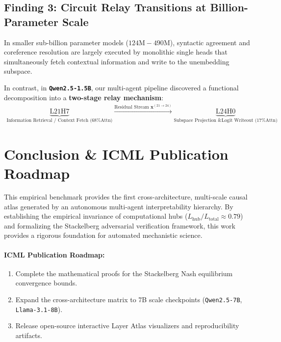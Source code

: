 \documentclass[10pt,a4paper]{article}
\begin{document}
\subsection{Finding 3: Circuit Relay Transitions at Billion-Parameter Scale}
In smaller sub-billion parameter models ($124\text{M} - 490\text{M}$), syntactic agreement and coreference resolution are largely executed by monolithic single heads that simultaneously fetch contextual information and write to the unembedding subspace. 

In contrast, in \textbf{\texttt{Qwen2.5-1.5B}}, our multi-agent pipeline discovered a functional decomposition into a \textbf{two-stage relay mechanism}:
\begin{equation}
\begin{aligned}
\underbrace{\text{L21H7}}_{\text{Information Retrieval / Context Fetch (68\% Attn)}} \xrightarrow{\text{Residual Stream } \boldsymbol{x}^{(21 \rightarrow 24)}} \underbrace{\text{L24H0}}_{\text{Subspace Projection \& Logit Writeout (17\% Attn)}}
\end{aligned}
\end{equation}

\section{Conclusion \& ICML Publication Roadmap}

This empirical benchmark provides the first cross-architecture, multi-scale causal atlas generated by an autonomous multi-agent interpretability hierarchy. By establishing the empirical invariance of computational hubs ($L_{\text{hub}}/L_{\text{total}} \approx 0.79$) and formalizing the Stackelberg adversarial verification framework, this work provides a rigorous foundation for automated mechanistic science.

\paragraph{ICML Publication Roadmap:}
\begin{enumerate}[leftmargin=*]
    \item Complete the mathematical proofs for the Stackelberg Nash equilibrium convergence bounds.
    \item Expand the cross-architecture matrix to 7B scale checkpoints (\texttt{Qwen2.5-7B}, \texttt{Llama-3.1-8B}).
    \item Release open-source interactive Layer Atlas visualizers and reproducibility artifacts.
\end{enumerate}
\end{document}
